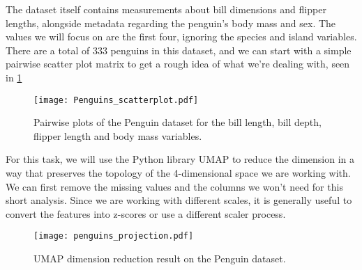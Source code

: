 The dataset itself contains measurements about bill dimensions and flipper lengths, alongside metadata regarding the penguin's body mass and sex. The values we will focus on are the first four, ignoring the species and island variables. There are a total of 333 penguins in this dataset, and we can start with a simple pairwise scatter plot matrix to get a rough idea of what we're dealing with, seen in \ref{fig:penguins_scatter}

\begin{table}[]
\centering
{}
\caption{First five rows of the Penguin dataset.}
\label{tab:penguins}
\end{table}

\begin{figure}[h!]
  \centering
  \texttt{[image: Penguins\_scatterplot.pdf]}
  \caption{Pairwise plots of the Penguin dataset for the bill length, bill depth, flipper length and body mass variables.}
  \label{fig:penguins_scatter}
\end{figure}

For this task, we will use the Python library UMAP \cite{mcinnes2018umap-software} to reduce the dimension in a way that preserves the topology of the 4-dimensional space we are working with. We can first remove the missing values and the columns we won't need for this short analysis. Since we are working with different scales, it is generally useful to convert the features into z-scores or use a different scaler process.

\begin{figure}[h!]
  \centering
  \texttt{[image: penguins\_projection.pdf]}
  \caption{UMAP dimension reduction result on the Penguin dataset.}
  \label{fig:penguins_projection}
\end{figure}

